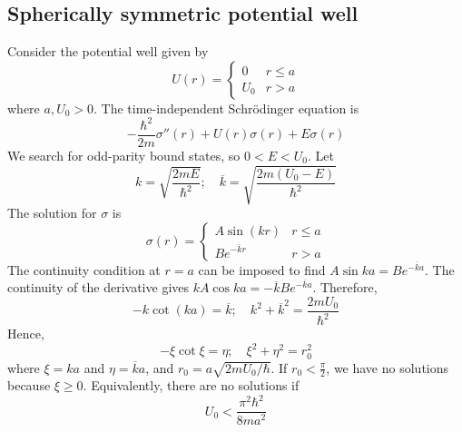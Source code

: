 \subsection{Spherically symmetric potential well}
Consider the potential well given by
\[
	U(r) = \begin{cases}
		0   & r \leq a \\
		U_0 & r > a
	\end{cases}
\]
where \( a, U_0 > 0 \).
The time-independent Schr\"odinger equation is
\[
	-\frac{\hbar^2}{2m} \sigma''(r) + U(r) \sigma(r) + E \sigma(r)
\]
We search for odd-parity bound states, so \( 0 < E < U_0 \).
Let
\[
	k = \sqrt{\frac{2mE}{\hbar^2}};\quad \overline k = \sqrt{\frac{2m(U_0 - E)}{\hbar^2}}
\]
The solution for \( \sigma \) is
\[
	\sigma(r) = \begin{cases}
		A \sin(kr)           & r \leq a \\
		B e^{-\overline k r} & r > a
	\end{cases}
\]
The continuity condition at \( r = a \) can be imposed to find \( A \sin ka = B e^{-\overline k a} \).
The continuity of the derivative gives \( kA \cos ka = -\overline k B e^{-\overline k a} \).
Therefore,
\[
	-k \cot(ka) = \overline k;\quad k^2 + \overline k^2 = \frac{2mU_0}{\hbar^2}
\]
Hence,
\[
	-\xi \cot \xi = \eta; \quad \xi^2 + \eta^2 = r_0^2
\]
where \( \xi = ka \) and \( \eta = \overline k a \), and \( r_0 = a\sqrt{2mU_0/\hbar} \).
If \( r_0 < \frac{\pi}{2} \), we have no solutions because \( \xi \geq 0 \).
Equivalently, there are no solutions if
\[
	U_0 < \frac{\pi^2 \hbar^2}{8ma^2}
\]
